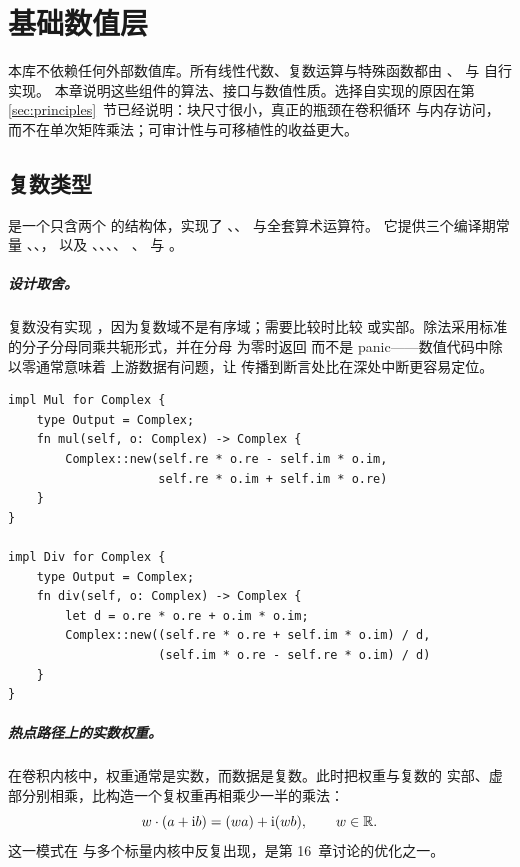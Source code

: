 \chapter{基础数值层}
\label{ch:numerics}

本库不依赖任何外部数值库。所有线性代数、复数运算与特殊函数都由
、 与  自行实现。
本章说明这些组件的算法、接口与数值性质。选择自实现的原因在第
\ref{sec:principles}~节已经说明：块尺寸很小，真正的瓶颈在卷积循环
与内存访问，而不在单次矩阵乘法；可审计性与可移植性的收益更大。

\section{复数类型}
\label{sec:complex}

 是一个只含两个  的结构体，实现了
、、 与全套算术运算符。
它提供三个编译期常量 、、，
以及 、、、、
、 与 。

\paragraph{设计取舍。}
复数没有实现 ，因为复数域不是有序域；需要比较时比较
 或实部。除法采用标准的分子分母同乘共轭形式，并在分母
为零时返回  而不是 panic——数值代码中除以零通常意味着
上游数据有问题，让  传播到断言处比在深处中断更容易定位。

\begin{lstlisting}[caption={复数的乘法与除法实现},label={lst:complex}]
impl Mul for Complex {
    type Output = Complex;
    fn mul(self, o: Complex) -> Complex {
        Complex::new(self.re * o.re - self.im * o.im,
                     self.re * o.im + self.im * o.re)
    }
}

impl Div for Complex {
    type Output = Complex;
    fn div(self, o: Complex) -> Complex {
        let d = o.re * o.re + o.im * o.im;
        Complex::new((self.re * o.re + self.im * o.im) / d,
                     (self.im * o.re - self.re * o.im) / d)
    }
}
\end{lstlisting}

\paragraph{热点路径上的实数权重。}
在卷积内核中，权重通常是实数，而数据是复数。此时把权重与复数的
实部、虚部分别相乘，比构造一个复权重再相乘少一半的乘法：
\begin{equation}
    w\cdot(a+\mathrm{i} b) = (wa) + \mathrm{i}(wb),
    \qquad w\in\mathbb{R} .
\end{equation}
这一模式在  与多个标量内核中反复出现，是第
16~章讨论的优化之一。

